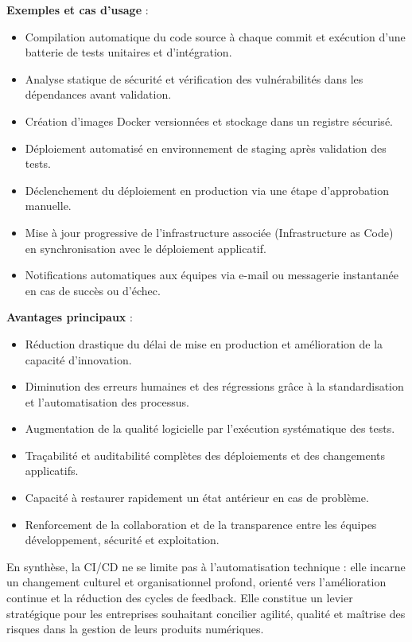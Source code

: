 \textbf{Exemples et cas d’usage} :
\begin{itemize}
	\item Compilation automatique du code source à chaque commit et exécution d’une batterie de tests unitaires et d’intégration.
	\item Analyse statique de sécurité et vérification des vulnérabilités dans les dépendances avant validation.
	\item Création d’images Docker versionnées et stockage dans un registre sécurisé.
	\item Déploiement automatisé en environnement de staging après validation des tests.
	\item Déclenchement du déploiement en production via une étape d’approbation manuelle.
	\item Mise à jour progressive de l’infrastructure associée (Infrastructure as Code) en synchronisation avec le déploiement applicatif.
	\item Notifications automatiques aux équipes via e-mail ou messagerie instantanée en cas de succès ou d’échec.
\end{itemize}

\textbf{Avantages principaux} :
\begin{itemize}
	\item Réduction drastique du délai de mise en production et amélioration de la capacité d’innovation.
	\item Diminution des erreurs humaines et des régressions grâce à la standardisation et l’automatisation des processus.
	\item Augmentation de la qualité logicielle par l’exécution systématique des tests.
	\item Traçabilité et auditabilité complètes des déploiements et des changements applicatifs.
	\item Capacité à restaurer rapidement un état antérieur en cas de problème.
	\item Renforcement de la collaboration et de la transparence entre les équipes développement, sécurité et exploitation.
\end{itemize}

En synthèse, la CI/CD ne se limite pas à l’automatisation technique : elle incarne un changement culturel et organisationnel profond, orienté vers l’amélioration continue et la réduction des cycles de feedback. Elle constitue un levier stratégique pour les entreprises souhaitant concilier agilité, qualité et maîtrise des risques dans la gestion de leurs produits numériques.

